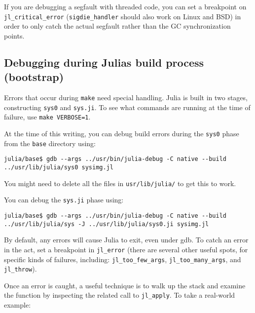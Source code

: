 If you are debugging a segfault with threaded code, you can set a breakpoint on \texttt{jl\_critical\_error} (\texttt{sigdie\_handler} should also work on Linux and BSD) in order to only catch the actual segfault rather than the GC synchronization points.



\hypertarget{8144212274800572894}{}


\subsection{Debugging during Julia{\textquotesingle}s build process (bootstrap)}



Errors that occur during \texttt{make} need special handling. Julia is built in two stages, constructing \texttt{sys0} and \texttt{sys.ji}. To see what commands are running at the time of failure, use \texttt{make VERBOSE=1}.



At the time of this writing, you can debug build errors during the \texttt{sys0} phase from the \texttt{base} directory using:




\begin{lstlisting}
julia/base$ gdb --args ../usr/bin/julia-debug -C native --build ../usr/lib/julia/sys0 sysimg.jl
\end{lstlisting}



You might need to delete all the files in \texttt{usr/lib/julia/} to get this to work.



You can debug the \texttt{sys.ji} phase using:




\begin{lstlisting}
julia/base$ gdb --args ../usr/bin/julia-debug -C native --build ../usr/lib/julia/sys -J ../usr/lib/julia/sys0.ji sysimg.jl
\end{lstlisting}



By default, any errors will cause Julia to exit, even under gdb. To catch an error {\textquotedbl}in the act{\textquotedbl}, set a breakpoint in \texttt{jl\_error} (there are several other useful spots, for specific kinds of failures, including: \texttt{jl\_too\_few\_args}, \texttt{jl\_too\_many\_args}, and \texttt{jl\_throw}).



Once an error is caught, a useful technique is to walk up the stack and examine the function by inspecting the related call to \texttt{jl\_apply}. To take a real-world example:




